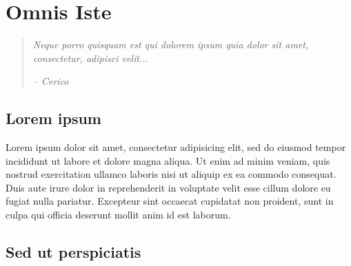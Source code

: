 
%
%
%


\chapter{Omnis Iste}
\label{ch:omnis}

\begin{quotation}
  {\small\it Neque porro quisquam est qui dolorem ipsum quia dolor sit amet, consectetur, adipisci velit...}

{\small\it -- Cerico}
\end{quotation}



\section{Lorem ipsum}

Lorem ipsum dolor sit amet, consectetur adipisicing elit, sed do eiusmod tempor incididunt ut labore et dolore magna aliqua. Ut enim ad minim veniam, quis nostrud exercitation ullamco laboris nisi ut aliquip ex ea commodo consequat. Duis aute irure dolor in reprehenderit in voluptate velit esse cillum dolore eu fugiat nulla pariatur. Excepteur sint occaecat cupidatat non proident, sunt in culpa qui officia deserunt mollit anim id est laborum.


\section{Sed ut perspiciatis}

